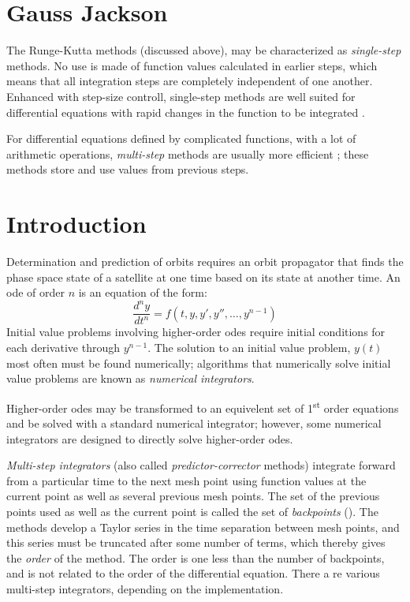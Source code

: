 \section{Gauss Jackson}
The Runge-Kutta methods (discussed above), may be characterized as \emph{single-step} 
methods. No use is made of function values calculated in earlier steps, which
means that all integration steps are completely independent of one another. Enhanced with  
step-size controll, single-step methods are well suited for differential 
equations with rapid changes in the function to be integrated \cite{Montenbruck2000}.

For differential equations defined by complicated functions, with a lot of arithmetic operations, 
\emph{multi-step} methods are usually more efficient \cite{Montenbruck2000}; these 
methods store and use values from previous steps.

\section{Introduction}
Determination and prediction of orbits requires an orbit propagator that finds the
phase space state of a satellite at one time based on its state at another time.
An \gls{ode} of order \( n \) is an equation of the form:
\begin{equation}
	\frac{d^n y}{dt^n} = f(t,y,y',y'',\ldots,y^{n-1})
\end{equation}
Initial value problems involving higher-order \glspl{ode} require initial conditions 
for each derivative through \( y^{n-1} \). 
The solution to an initial value problem, \( y(t) \) most often must be found numerically;
algorithms that numerically solve initial value problems are known as \emph{numerical integrators}.

Higher-order \glspl{ode} may be transformed to an equivelent set of 1\textsuperscript{st} 
order equations and be solved with a standard numerical integrator; however, some 
numerical integrators are designed to directly solve higher-order \glspl{ode}.

\emph{Multi-step integrators} (also called \emph{predictor-corrector} methods) 
integrate forward from a particular time to the next mesh
point using function values at the current point as well as several previous mesh
points. The set of the previous points used as well as the current point is called the
set of \emph{backpoints} (\cite{berry2004}). The methods develop a Taylor series 
in the time separation between mesh points, and this series must be truncated after 
some number of terms, which thereby gives the \emph{order} of the method. The order is one 
less than the number of backpoints, and is not related to the order of the differential equation.
There a re various multi-step integrators, depending on the implementation.

